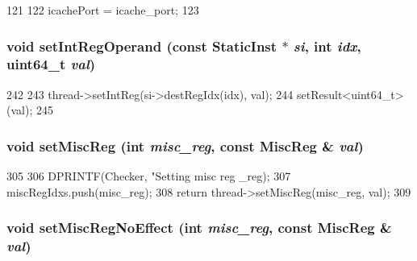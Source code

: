 \begin{DoxyCode}
121 {
122     icachePort = icache_port;
123 }
\end{DoxyCode}
\hypertarget{classCheckerCPU_a654e99f2be7cd298378462ce9651bb44}{
\subsubsection[{setIntRegOperand}]{\setlength{\rightskip}{0pt plus 5cm}void setIntRegOperand (const {\bf StaticInst} $\ast$ {\em si}, \/  int {\em idx}, \/  uint64\_\-t {\em val})}}
\label{classCheckerCPU_a654e99f2be7cd298378462ce9651bb44}



\begin{DoxyCode}
242     {
243         thread->setIntReg(si->destRegIdx(idx), val);
244         setResult<uint64_t>(val);
245     }
\end{DoxyCode}
\hypertarget{classCheckerCPU_a1877dde4f3eb17a8b7d33ea40176c148}{
\subsubsection[{setMiscReg}]{\setlength{\rightskip}{0pt plus 5cm}void setMiscReg (int {\em misc\_\-reg}, \/  const {\bf MiscReg} \& {\em val})}}
\label{classCheckerCPU_a1877dde4f3eb17a8b7d33ea40176c148}



\begin{DoxyCode}
305     {
306         DPRINTF(Checker, "Setting misc reg %
      _reg);
307         miscRegIdxs.push(misc_reg);
308         return thread->setMiscReg(misc_reg, val);
309     }
\end{DoxyCode}
\hypertarget{classCheckerCPU_a763517aaea2f3decbc1ef9d064216b6f}{
\subsubsection[{setMiscRegNoEffect}]{\setlength{\rightskip}{0pt plus 5cm}void setMiscRegNoEffect (int {\em misc\_\-reg}, \/  const {\bf MiscReg} \& {\em val})}}
\label{classCheckerCPU_a763517aaea2f3decbc1ef9d064216b6f}



